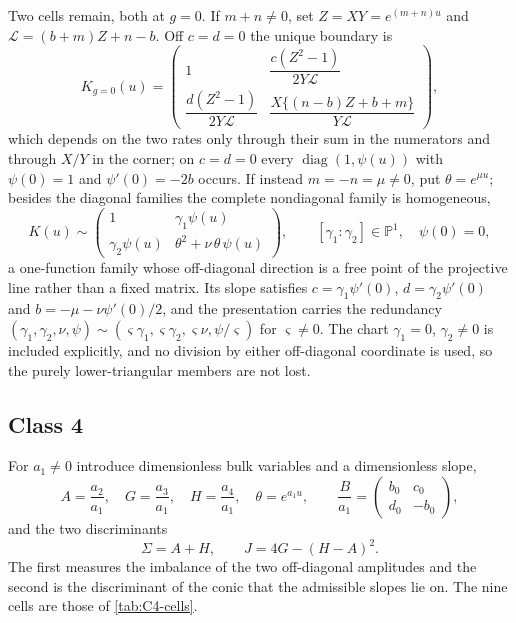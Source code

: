 \documentclass[11pt,reqno]{amsart}
\theoremstyle{plain}
\theoremstyle{definition}
\theoremstyle{remark}
\numberwithin{equation}{section}
\providecommand{\diag}{\operatorname{diag}}
\begin{document}
Two cells remain, both at $g=0$. If $m+n\ne0$, set $Z=XY=e^{(m+n)u}$ and
$\mathcal L=(b+m)Z+n-b$. Off $c=d=0$ the unique boundary is
\begin{equation}
K_{g=0}(u)=\begin{pmatrix}
1&\dfrac{c(Z^2-1)}{2Y\mathcal L}\\[1mm]
\dfrac{d(Z^2-1)}{2Y\mathcal L}&
\dfrac{X\{(n-b)Z+b+m\}}{Y\mathcal L}
\end{pmatrix},                                     \label{eq:C3-gzero}
\end{equation}
which depends on the two rates only through their sum in the numerators and
through $X/Y$ in the corner; on $c=d=0$ every $\diag(1,\psi(u))$ with $\psi(0)=1$
and $\psi'(0)=-2b$ occurs. If instead $m=-n=\mu\ne0$, put $\theta=e^{\mu u}$;
besides the diagonal families the complete nondiagonal family is homogeneous,
\begin{equation}
K(u)\sim\begin{pmatrix}
1&\gamma_1\psi(u)\\ \gamma_2\psi(u)&\theta^2+\nu\,\theta\,\psi(u)
\end{pmatrix},\qquad [\gamma_1:\gamma_2]\in\mathbb P^1,\quad \psi(0)=0,
\label{eq:C3-opposite}
\end{equation}
a one-function family whose off-diagonal direction is a free point of the
projective line rather than a fixed matrix. Its slope satisfies
$c=\gamma_1\psi'(0)$, $d=\gamma_2\psi'(0)$ and $b=-\mu-\nu\psi'(0)/2$, and the
presentation carries the redundancy
$(\gamma_1,\gamma_2,\nu,\psi)\sim(\varsigma\gamma_1,\varsigma\gamma_2,\varsigma\nu,
\psi/\varsigma)$ for $\varsigma\ne0$. The chart $\gamma_1=0$, $\gamma_2\ne0$ is
included explicitly, and no division by either off-diagonal coordinate is used,
so the purely lower-triangular members are not lost.

\subsection{Class 4}
\label{subsec:c4}

For $a_1\ne0$ introduce dimensionless bulk variables and a dimensionless slope,
\begin{equation}
A=\frac{a_2}{a_1},\quad G=\frac{a_3}{a_1},\quad
H=\frac{a_4}{a_1},\quad \theta=e^{a_1u},\qquad
\frac B{a_1}=\begin{pmatrix}b_0&c_0\\d_0&-b_0\end{pmatrix},
\label{eq:C4-vars}
\end{equation}
and the two discriminants
\begin{equation}
\Sigma=A+H,\qquad J=4G-(H-A)^2.                         \label{eq:C4-discriminants}
\end{equation}
The first measures the imbalance of the two off-diagonal amplitudes and the
second is the discriminant of the conic that the admissible slopes lie on. The
nine cells are those of \cref{tab:C4-cells}.
\end{document}
